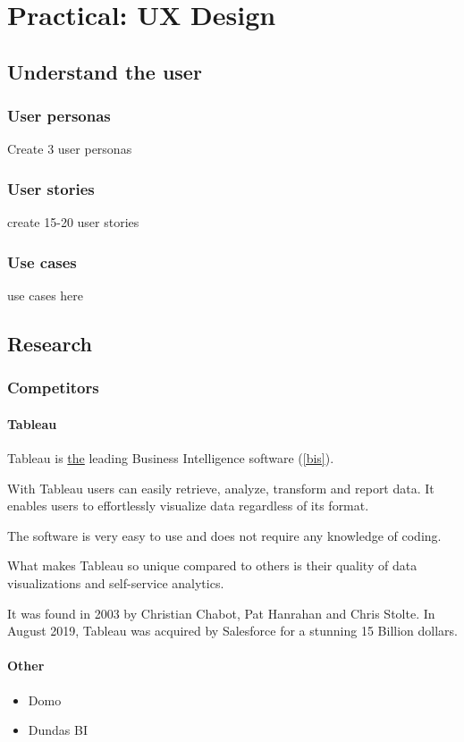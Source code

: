 \chapter{Practical: UX Design}

\section{Understand the user}
    \subsection{User personas}
        Create 3 user personas
    \subsection{User stories}
        create 15-20 user stories
    \subsection{Use cases}
        use cases here

\section{Research}
    \subsection{Competitors}
        \subsubsection{Tableau}
        Tableau is \underline{the} leading Business Intelligence software (\autoref{bis}). 
        
        With Tableau users can easily retrieve, analyze, transform and report data.   
        It enables users to effortlessly visualize data regardless of its format.
        
        The software is very easy to use and does not require any knowledge of coding. 
        
        
        What makes Tableau so unique compared to others is their quality of data visualizations and self-service analytics. 
        
        It was found in 2003 by Christian Chabot, Pat Hanrahan and Chris Stolte. In August 2019, Tableau was acquired by Salesforce for a stunning 15 Billion dollars.
        
        \subsubsection{Other}
        \begin{itemize}
            \item{Domo}
            \item{Dundas BI}
        \end{itemize}
        
